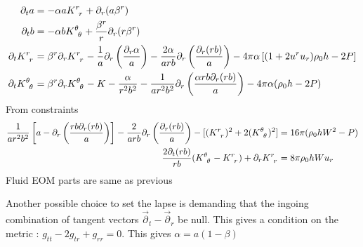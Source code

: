 \documentclass[prd]{revtex4}
\newcommand*\apost{\textsc{\char13}}
\begin{document}
\begin{align}
\partial_t a &= - \alpha a K\indices{^r_r} + \partial_r (a \beta^r) \\
\partial_t b &= - \alpha b K\indices{^\theta_\theta} + \frac{\beta^r}{r} \partial_r (r \beta^r) \\
\partial_t K\indices{^r_r} &= \beta^r \partial_r K\indices{^r_r}  - \frac{1}{a} \partial_r \left( \frac{\partial_r \alpha}{a} \right) - \frac{2 \alpha}{arb} \partial_r \left( \frac{\partial_r (rb)}{a} \right) 
 - 4 \pi \alpha \left[ (1+2 u^r u_r) \rho_0 h - 2P \right] \\
\partial_t K\indices{^\theta_\theta} &= \beta^r \partial_r K\indices{^\theta_\theta} - K - \frac{\alpha}{r^2 b^2} - \frac{1}{ar^2b^2} \partial_r \left( \frac{\alpha r b \partial_r (rb)}{a} \right)  - 4 \pi \alpha (\rho_0 h -2 P)
\end{align}
From constraints
\begin{align}
 \frac{1}{ar^2b^2} \left[a-\partial_r \left(\frac{rb \partial_r (rb)}{a} \right) \right] -\frac{2}{arb} \partial_r \left(\frac{\partial_r (rb)}{a} \right) - [(K\indices{^r_r})^2+2 (K\indices{^\theta_\theta})^2] &= 16 \pi (\rho_0 h W^2 -P) \nonumber \\
 \frac{2 \partial_t (r b)}{rb} (K\indices{^\theta_\theta} - K\indices{^r_r}) + \partial_r K\indices{^r_r} &= 8 \pi \rho_0 h W u_r
\end{align}
Fluid EOM parts are same as previous

Another possible choice to set the lapse is demanding that the ingoing combination of tangent vectors $\vec{\partial}_t - \vec{\partial}_r$ be null. This gives a condition on the metric : $g_{tt} - 2 g_{tr} + g_{rr}=0$. This gives $\alpha = a(1-\beta)$


\end{document}
